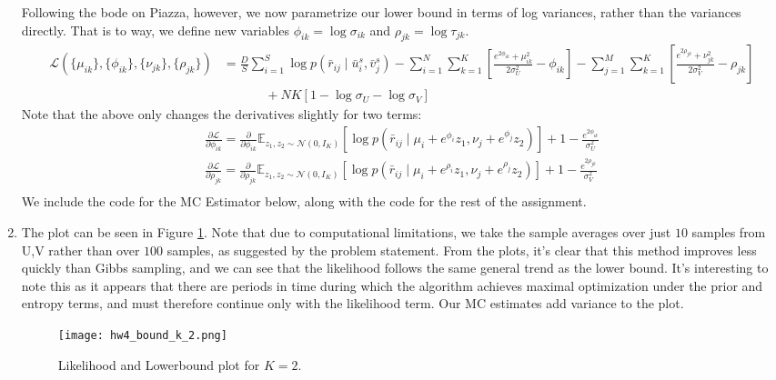 \documentclass{harvardml}
\newcommand{\E}{\mathbb{E}}
\newcommand{\N}{\mathcal{N}}
\theoremstyle{plain}
\begin{document}
\begin{enumerate}
Following the bode on Piazza, however, we now parametrize our lower bound in terms of log variances, rather than the variances directly. That is to way, we define new variables $\phi_{ik} = \log \sigma_{ik}$ and $\rho_{jk} = \log \tau_{jk}$.
\begin{align*}
\mathcal{L}(\{\mu_{ik}\}, \{\phi_{ik} \}, \{\nu_{jk}\}, \{\rho_{jk} \}) &=  \frac{D}{S} \sum_{i=1}^S \log p(\bar{r}_{ij} \mid \bar{u}^s_i, \bar{v}^s_j) -\sum_{i=1}^N \sum_{k=1}^K \left[  \frac{e^{2\phi_{ik}} + \mu_{ik}^2}{2\sigma_U^2} - \phi_{ik}  \right] - \sum_{j=1}^M \sum_{k=1}^K \left[ \frac{e^{2\rho_{jk}} + \nu_{jk}^2}{2\sigma_V^2} - \rho_{jk} \right] \\
&~~~~~~~~~~~~~~~ + NK[1  -\log \sigma_U - \log \sigma_V]
\end{align*}
Note that the above only changes the derivatives slightly for two terms:
\begin{align*}
\frac{\partial \mathcal{L}}{\partial \phi_{ik}} = \frac{\partial}{\partial \phi_{ik}}\E_{z_1,z_2 \sim \N(0,I_K)} [\log p(\bar{r}_{ij} \mid \mu_{i} + e^{\phi_{i}}z_1, \nu_j+ e^{\phi_{j}} z_2)]  + 1 - \frac{e^{2\phi_{ik}}}{\sigma_U^2}\\
 \frac{\partial \mathcal{L}}{\partial \rho_{jk}} = \frac{\partial}{\partial \rho_{jk}}\E_{z_1,z_2 \sim \N(0,I_K)} [\log p(\bar{r}_{ij} \mid \mu_{i} + e^{\rho_{i}}z_1, \nu_j+ e^{\rho_{j}} z_2)]  + 1 - \frac{e^{2\rho_{jk}}}{\sigma_V^2} \\
\end{align*}
We include the code for the MC Estimator below, along with the code for the rest of the assignment.

\item
The plot can be seen in Figure \ref{fig:bound_plot}. Note that due to computational limitations, we take the sample averages over just $10$ samples from U,V rather than over $100$ samples, as suggested by the problem statement. From the plots, it's clear that this method improves less quickly than Gibbs sampling, and we can see that the likelihood follows the same general trend as the lower bound. It's interesting to note this as it appears that there are periods in time during which the algorithm achieves maximal optimization under the prior and entropy terms, and must therefore continue only with the likelihood term. Our MC estimates add variance to the plot.

\begin{figure}[h!]
\centering
\texttt{[image: hw4\_bound\_k\_2.png]}
\caption{Likelihood and Lowerbound plot for $K = 2$.}
\label{fig:bound_plot}
\end{figure}


\end{enumerate}
\end{document}
